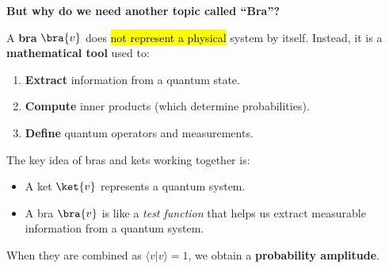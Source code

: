 \highspace
\begin{flushleft}
    \textcolor{Green3}{ \textbf{But why do we need another topic called ``Bra''?}}
\end{flushleft}
A \textbf{bra} $\bra{v}$ does \hl{not represent a physical} system by itself. Instead, it is a \textbf{mathematical tool} used to:
\begin{enumerate}
    \item \textbf{Extract} information from a quantum state.
    \item \textbf{Compute} inner products (which determine probabilities).
    \item \textbf{Define} quantum operators and measurements.
\end{enumerate}
The key idea of bras and kets working together is:
\begin{itemize}
    \item A ket $\ket{v}$ represents a quantum system.
    \item A bra $\bra{v}$ is like a \emph{test function} that helps us extract measurable information from a quantum system.
\end{itemize}
When they are combined as $\langle v | v \rangle = 1$, we obtain a \textbf{probability amplitude}.

\newpage


